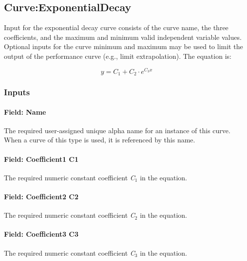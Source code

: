 \subsection{Curve:ExponentialDecay}\label{curveexponentialdecay}

Input for the exponential decay curve consists of the curve name, the three coefficients, and the maximum and minimum valid independent variable values. Optional inputs for the curve minimum and maximum may be used to limit the output of the performance curve (e.g., limit extrapolation). The equation is:

\begin{equation}
  y = C_1 + C_2 \cdot e^{C_3 x}
\end{equation}

\subsubsection{Inputs}\label{inputs-17-005}

\paragraph{Field: Name}\label{field-name-17-004}

The required user-assigned unique alpha name for an instance of this curve. When a curve of this type is used, it is referenced by this name.

\paragraph{Field: Coefficient1 C1}\label{field-coefficient1-c1-4}

The required numeric constant coefficient \emph{C\(_{1}\)} in the equation.

\paragraph{Field: Coefficient2 C2}\label{field-coefficient2-c2-4}

The required numeric constant coefficient \emph{C\(_{2}\)} in the equation.

\paragraph{Field: Coefficient3 C3}\label{field-coefficient3-c3-4}

The required numeric constant coefficient \emph{C\(_{3}\)} in the equation.

